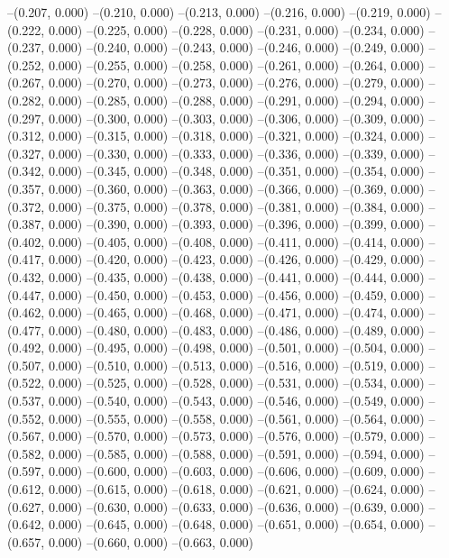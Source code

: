 --(0.207, 0.000)
--(0.210, 0.000)
--(0.213, 0.000)
--(0.216, 0.000)
--(0.219, 0.000)
--(0.222, 0.000)
--(0.225, 0.000)
--(0.228, 0.000)
--(0.231, 0.000)
--(0.234, 0.000)
--(0.237, 0.000)
--(0.240, 0.000)
--(0.243, 0.000)
--(0.246, 0.000)
--(0.249, 0.000)
--(0.252, 0.000)
--(0.255, 0.000)
--(0.258, 0.000)
--(0.261, 0.000)
--(0.264, 0.000)
--(0.267, 0.000)
--(0.270, 0.000)
--(0.273, 0.000)
--(0.276, 0.000)
--(0.279, 0.000)
--(0.282, 0.000)
--(0.285, 0.000)
--(0.288, 0.000)
--(0.291, 0.000)
--(0.294, 0.000)
--(0.297, 0.000)
--(0.300, 0.000)
--(0.303, 0.000)
--(0.306, 0.000)
--(0.309, 0.000)
--(0.312, 0.000)
--(0.315, 0.000)
--(0.318, 0.000)
--(0.321, 0.000)
--(0.324, 0.000)
--(0.327, 0.000)
--(0.330, 0.000)
--(0.333, 0.000)
--(0.336, 0.000)
--(0.339, 0.000)
--(0.342, 0.000)
--(0.345, 0.000)
--(0.348, 0.000)
--(0.351, 0.000)
--(0.354, 0.000)
--(0.357, 0.000)
--(0.360, 0.000)
--(0.363, 0.000)
--(0.366, 0.000)
--(0.369, 0.000)
--(0.372, 0.000)
--(0.375, 0.000)
--(0.378, 0.000)
--(0.381, 0.000)
--(0.384, 0.000)
--(0.387, 0.000)
--(0.390, 0.000)
--(0.393, 0.000)
--(0.396, 0.000)
--(0.399, 0.000)
--(0.402, 0.000)
--(0.405, 0.000)
--(0.408, 0.000)
--(0.411, 0.000)
--(0.414, 0.000)
--(0.417, 0.000)
--(0.420, 0.000)
--(0.423, 0.000)
--(0.426, 0.000)
--(0.429, 0.000)
--(0.432, 0.000)
--(0.435, 0.000)
--(0.438, 0.000)
--(0.441, 0.000)
--(0.444, 0.000)
--(0.447, 0.000)
--(0.450, 0.000)
--(0.453, 0.000)
--(0.456, 0.000)
--(0.459, 0.000)
--(0.462, 0.000)
--(0.465, 0.000)
--(0.468, 0.000)
--(0.471, 0.000)
--(0.474, 0.000)
--(0.477, 0.000)
--(0.480, 0.000)
--(0.483, 0.000)
--(0.486, 0.000)
--(0.489, 0.000)
--(0.492, 0.000)
--(0.495, 0.000)
--(0.498, 0.000)
--(0.501, 0.000)
--(0.504, 0.000)
--(0.507, 0.000)
--(0.510, 0.000)
--(0.513, 0.000)
--(0.516, 0.000)
--(0.519, 0.000)
--(0.522, 0.000)
--(0.525, 0.000)
--(0.528, 0.000)
--(0.531, 0.000)
--(0.534, 0.000)
--(0.537, 0.000)
--(0.540, 0.000)
--(0.543, 0.000)
--(0.546, 0.000)
--(0.549, 0.000)
--(0.552, 0.000)
--(0.555, 0.000)
--(0.558, 0.000)
--(0.561, 0.000)
--(0.564, 0.000)
--(0.567, 0.000)
--(0.570, 0.000)
--(0.573, 0.000)
--(0.576, 0.000)
--(0.579, 0.000)
--(0.582, 0.000)
--(0.585, 0.000)
--(0.588, 0.000)
--(0.591, 0.000)
--(0.594, 0.000)
--(0.597, 0.000)
--(0.600, 0.000)
--(0.603, 0.000)
--(0.606, 0.000)
--(0.609, 0.000)
--(0.612, 0.000)
--(0.615, 0.000)
--(0.618, 0.000)
--(0.621, 0.000)
--(0.624, 0.000)
--(0.627, 0.000)
--(0.630, 0.000)
--(0.633, 0.000)
--(0.636, 0.000)
--(0.639, 0.000)
--(0.642, 0.000)
--(0.645, 0.000)
--(0.648, 0.000)
--(0.651, 0.000)
--(0.654, 0.000)
--(0.657, 0.000)
--(0.660, 0.000)
--(0.663, 0.000)
